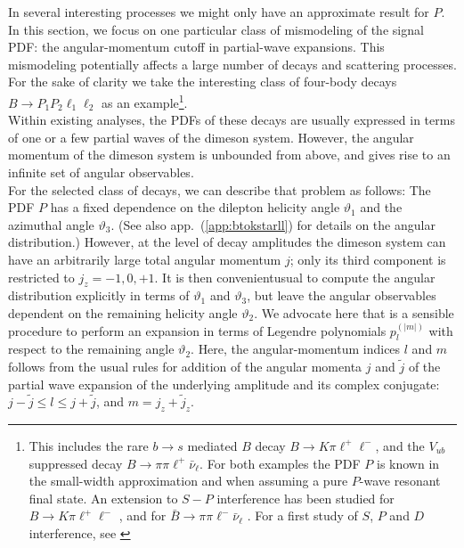 \documentclass[aps,prd,reprint,nofootinbib,preprintnumbers]{revtex4}
\newcommand{\refapp}[1]{app.~(\ref{app:#1})}
\renewcommand{\theta}{\vartheta}
\newcommand{\add}[1]{\textcolor{green!85!black}{#1}}
\newcommand{\del}[1]{\textcolor{red!85!black}{#1}}
\begin{document}
In several interesting processes we might only have an approximate
result for $P$.  In this section, we focus on one particular class of
mismodeling of the signal PDF: the angular-momentum cutoff in partial-wave expansions. This mismodeling potentially affects a large number
of decays and scattering processes. For the sake of clarity we take
the interesting class of four-body decays $B\to P_1 P_2 \ell_1 \ell_2$
as an example\footnote{This includes the rare $b\to s$ mediated $B$ decay $B
  \to K\pi\ell^+\ell^-$, and the $V_{ub}$ suppressed decay $B\to
  \pi\pi\ell^+\bar\nu_\ell$. For both examples the PDF $P$ is known in
  the small-width approximation and when assuming a pure $P$-wave
  resonant final state. An extension to $S-P$ interference has been
  studied for $B\to K\pi\ell^+\ell^-$
  \cite{Blake:2012mb,Becirevic:2011bp}, and for $\bar{B}\to
  \pi\pi\ell^-\bar\nu_\ell$ \cite{Faller:2013dwa}. For a first study
  of $S$, $P$
  and $D$ interference, see \cite{Das:2014sra}
}.\\

Within existing analyses, the PDFs of these decays are usually expressed in terms of one or a few
partial waves of the dimeson system. However, the angular momentum of the dimeson system is unbounded
from above, and gives rise to an infinite set of angular observables.\\

For the selected class of decays, we can describe that problem as follows: The PDF $P$ has a fixed dependence on the dilepton
helicity angle $\theta_1$ and the azimuthal angle $\theta_3$. (See also \refapp{btokstarll} for details
on the angular distribution.) However, at the level of decay amplitudes the dimeson system can have an arbitrarily
large total angular momentum $j$; only its third component is restricted to $j_z = -1,0,+1$.
It is then \add{convenient}\del{usual} to compute the angular distribution explicitly in terms of $\theta_1$ and $\theta_3$, but leave
the angular observables dependent on the remaining helicity angle $\theta_2$.
We advocate here that is a sensible procedure to perform an expansion in terms of Legendre polynomials $p_{l}^{(|m|)}$
with respect to the remaining angle $\theta_2$. \add{Here, the angular-momentum indices $l$ and $m$ follows from the usual
rules for addition of the angular momenta $j$ and $\tilde{j}$ of the partial wave expansion of the underlying
amplitude and its complex conjugate: $j - \tilde{j} \leq l \leq j + \tilde{j}$, and $m = j_z + \tilde{j}_z$.}
\end{document}
